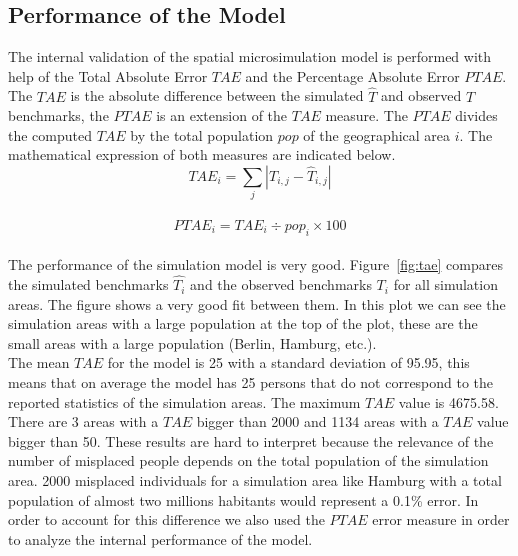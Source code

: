 \documentclass[runningheads,a4paper]{llncs}
\begin{document}
\subsection{Performance of the Model}\label{subsec:performance}

The internal validation of the spatial microsimulation model is performed with
help of the Total Absolute Error $TAE$ and the Percentage Absolute Error $PTAE$.
The $TAE$ is the absolute difference between the simulated
$\hat{T}$ and observed $T$ benchmarks, the $PTAE$ is an extension of the
$TAE$ measure. The $PTAE$ divides the computed $TAE$ by the total population
$pop$ of the geographical area $i$. The mathematical expression of both
measures are indicated below.
\\

\begin{equation}\label{eq:tae}
    TAE_i = \sum_j \left| T_{i,j} - \hat{T}_{i,j} \right| 
\end{equation}
\\

\begin{equation}\label{eq:ptae}
    PTAE_i = TAE_i \div pop_i \times 100
\end{equation}
\\

The performance of the simulation model is very good. Figure~\ref{fig:tae}
compares the simulated benchmarks $\hat{T_i}$ and the observed benchmarks
$T_i$ for all simulation areas. The figure shows a very good fit between them.
In this plot we can see the simulation areas with a large population at the top
of the plot, these are the small areas with a large population (Berlin,
Hamburg, etc.).
\\

The mean $TAE$ for the model is 25 with a standard deviation of 95.95, this
means that on average the model has 25 persons that do not correspond to the
reported statistics of the simulation areas. The maximum $TAE$ value is 
4675.58. There are 3 areas with a $TAE$ bigger than 2000 and 1134 areas with a
$TAE$ value bigger than 50. These results are hard to interpret because the
relevance of the number of misplaced people depends on the total population of
the simulation area. 2000 misplaced individuals for a simulation area like
Hamburg with a total population of almost two millions habitants would
represent a 0.1\% error.
In order to account for this difference we also used the $PTAE$ error measure
in order to analyze the internal performance of the model.
\\
\end{document}
